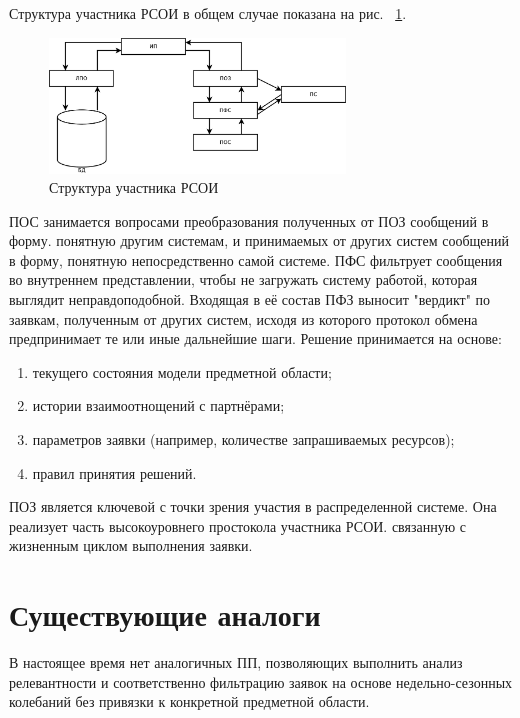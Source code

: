 \documentclass[utf8x, 12pt]{G7-32}
\begin{document}
Структура участника РСОИ в общем случае показана на рис. ~\ref{fig:participant}. 
\begin{figure}
        \centering
        \includegraphics[width=0.7\textwidth]{inc/dia/rpz-participant}
        \caption{Структура участника РСОИ}
        \label{fig:participant}
\end{figure}
ПОС занимается вопросами преобразования полученных от ПОЗ сообщений в форму.
понятную другим системам, и принимаемых от других систем сообщений в форму,
понятную непосредственно самой системе. ПФС фильтрует сообщения во внутреннем 
представлении, чтобы не загружать систему работой, которая выглядит 
неправдоподобной. Входящая в её состав ПФЗ выносит "вердикт" по заявкам, 
полученным от других систем, исходя из которого протокол обмена предпринимает те или 
иные дальнейшие шаги. Решение принимается на основе:
\begin{enumerate}
        \item текущего состояния модели предметной области;
        \item истории взаимоотнощений с партнёрами;
        \item параметров заявки (например, количестве запрашиваемых ресурсов);
        \item правил принятия решений.
\end{enumerate}
ПОЗ является ключевой с точки зрения участия в распределенной системе. Она 
реализует часть высокоуровнего простокола участника РСОИ. связанную с жизненным 
циклом выполнения заявки.

\section{Существующие аналоги}
В настоящее время нет аналогичных ПП, позволяющих выполнить анализ релевантности
и соответственно фильтрацию заявок на основе недельно-сезонных колебаний без 
привязки к конкретной предметной области.
\end{document}
